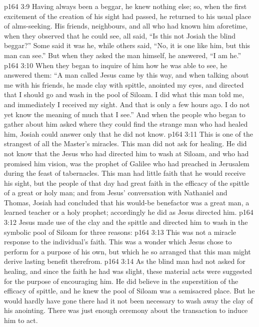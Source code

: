 \vs p164 3:9 Having always been a beggar, he knew nothing else; so, when the first excitement of the creation of his sight had passed, he returned to his usual place of alms\hyp{}seeking. His friends, neighbours, and all who had known him aforetime, when they observed that he could see, all said, “Is this not Josiah the blind beggar?” Some said it was he, while others said, “No, it is one like him, but this man can see.” But when they asked the man himself, he answered, “I am he.”
\vs p164 3:10 When they began to inquire of him how he was able to see, he answered them: “A man called Jesus came by this way, and when talking about me with his friends, he made clay with spittle, anointed my eyes, and directed that I should go and wash in the pool of Siloam. I did what this man told me, and immediately I received my sight. And that is only a few hours ago. I do not yet know the meaning of much that I see.” And when the people who began to gather about him asked where they could find the strange man who had healed him, Josiah could answer only that he did not know.
\vs p164 3:11 \pc This is one of the strangest of all the Master’s miracles. This man did not ask for healing. He did not know that the Jesus who had directed him to wash at Siloam, and who had promised him vision, was the prophet of Galilee who had preached in Jerusalem during the feast of tabernacles. This man had little faith that he would receive his sight, but the people of that day had great faith in the efficacy of the spittle of a great or holy man; and from Jesus’ conversation with Nathaniel and Thomas, Josiah had concluded that his would\hyp{}be benefactor was a great man, a learned teacher or a holy prophet; accordingly he did as Jesus directed him.
\vs p164 3:12 Jesus made use of the clay and the spittle and directed him to wash in the symbolic pool of Siloam for three reasons:
\vs p164 3:13 \bibnobreakspace This was not a miracle response to the individual’s faith. This was a wonder which Jesus chose to perform for a purpose of his own, but which he so arranged that this man might derive lasting benefit therefrom.
\vs p164 3:14 \bibnobreakspace As the blind man had not asked for healing, and since the faith he had was slight, these material acts were suggested for the purpose of encouraging him. He did believe in the superstition of the efficacy of spittle, and he knew the pool of Siloam was a semisacred place. But he would hardly have gone there had it not been necessary to wash away the clay of his anointing. There was just enough ceremony about the transaction to induce him to act.
